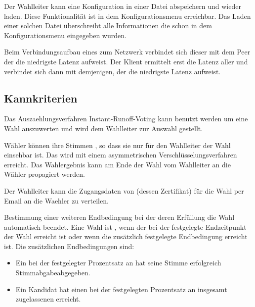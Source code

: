 \documentclass[parskip=full,11pt,twoside]{scrartcl}
\begin{document}
Der \gls{Wahlleiter} kann eine \gls{Konfiguration} in einer Datei abspeichern und wieder laden. Diese Funktionalität ist in dem \gls{Konfigurationsmenu} erreichbar. Das Laden einer solchen Datei überschreibt alle Informationen die schon in dem \gls{Konfigurationsmenu} eingegeben wurden.

Beim Verbindungsaufbau eines  zum \gls{Netzwerk} verbindet sich dieser mit dem \gls{Peer} der die niedrigste \gls{Latenz} aufweist. Der \gls{Klient} ermittelt erst die \gls{Latenz} aller  und verbindet sich dann mit demjenigen, der die niedrigste \gls{Latenz} aufweist.

\subsection{Kannkriterien}

Das \gls{Auszaehlungsverfahren} \gls{Instant-Runoff-Voting} kann benutzt werden um eine Wahl auszuwerten und wird dem \gls{Wahlleiter} zur Auswahl gestellt.

Wähler können ihre Stimmen , so dass sie nur für den \gls{Wahlleiter} der Wahl einsehbar ist.
Das wird mit einem asymmetrischen Verschlüsselungsverfahren erreicht.
Das Wahlergebnis kann am Ende der Wahl vom Wahlleiter an die Wähler propagiert werden.

Der \gls{Wahlleiter} kann die Zugangsdaten von  (dessen \gls{Zertifikat}) für die \gls{Wahl} per Email an die \gls{Waehler} zu verteilen.

Bestimmung einer weiteren Endbedingung bei der  deren Erfüllung die \gls{Wahl} automatisch beendet.
Eine Wahl ist , wenn der bei der  festgelegte Endzeitpunkt der Wahl erreicht ist oder wenn die zusätzlich festgelegte Endbedingung erreicht ist.
Die zusätzlichen Endbedingungen sind:\\
\begin{itemize}
	\item Ein bei der  festgelegter Prozentsatz an  hat seine Stimme erfolgreich \gls{Stimmabgabe}{abgegeben}.\\
	\item Ein \gls{Kandidat} hat einen bei der  festgelegten Prozentsatz an insgesamt zugelassenen  erreicht.
\end{itemize}
\end{document}
